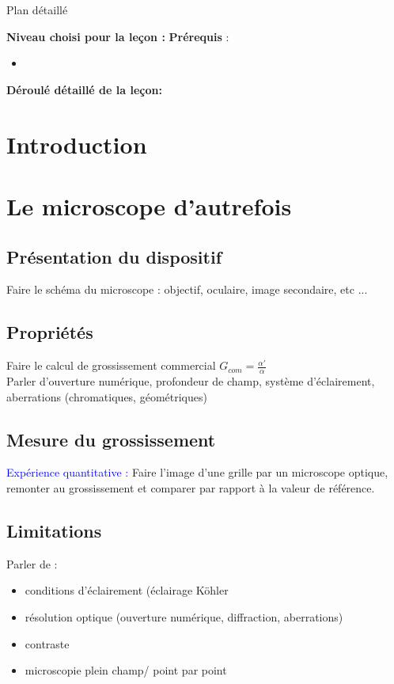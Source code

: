 \begin{reportBlock}{Plan détaillé}

  \textbf{Niveau choisi pour la leçon :} 
  \newline
  \textbf{Prérequis} : \begin{itemize}
      \item 
  \end{itemize}

  \textbf{Déroulé détaillé de la leçon: }  
  
  \section*{Introduction}


  \section{Le microscope \og d'autrefois \fg }

  \subsection{Présentation du dispositif}
  Faire le schéma du microscope : objectif, oculaire, image secondaire, etc ...

  \subsection{Propriétés}
  Faire le calcul de grossissement commercial $G_{com}=\frac{\alpha'}{\alpha}$\\
  Parler d'ouverture numérique, profondeur de champ, système d'éclairement, aberrations (chromatiques, géométriques)
  
  \subsection{Mesure du grossissement}
 
  \textcolor{blue}{Expérience quantitative :} Faire l'image d'une grille par un microscope optique, remonter au grossissement et comparer par rapport à la valeur de référence.

  \subsection{Limitations}
  Parler de : 
  \begin{itemize}
      \item conditions d'éclairement (éclairage Köhler
      \item résolution optique (ouverture numérique, diffraction, aberrations) 
      \item contraste
      \item microscopie plein champ/ point par point
  \end{itemize}



\end{reportBlock}

